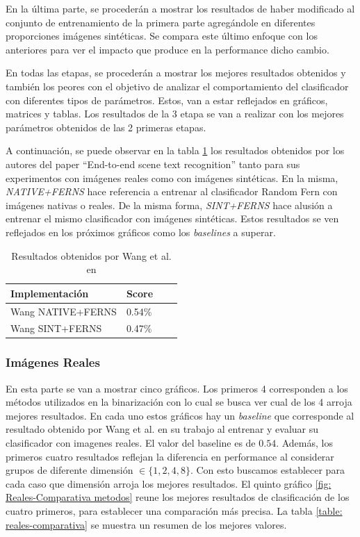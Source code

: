 	En la última parte, se procederán a mostrar los resultados de haber modificado al conjunto de entrenamiento de la primera parte agregándole en diferentes proporciones imágenes sintéticas. Se compara este último enfoque con los anteriores para ver el impacto que produce en la performance dicho cambio.
	
	En todas las etapas, se procederán a mostrar los mejores resultados obtenidos y también los peores con el objetivo de analizar el comportamiento del clasificador con diferentes tipos de parámetros. Estos, van a estar reflejados en gráficos, matrices y tablas. Los resultados de la 3 etapa se van a realizar con los mejores parámetros obtenidos de las 2 primeras etapas.
	
	A continuación, se puede observar en la tabla \ref{table: Wang paper} los resultados obtenidos por los autores del paper ``End-to-end scene text recognition'' tanto para sus experimentos con imágenes reales como con imágenes sintéticas. En la misma, \textit{NATIVE+FERNS} hace referencia a entrenar al clasificador Random Fern con imágenes nativas o reales. De la misma forma, \textit{SINT+FERNS} hace alusión a entrenar el mismo clasificador con imágenes sintéticas. Estos resultados se ven reflejados en los próximos gráficos como los \textit{baselines} a superar.
	
	\begin{table}
		\centering
	    \begin{tabular}{ | l | l | l | p{5cm} |}
    			\hline
    				\textbf{Implementación} & \textbf{Score} \\ \hline
    				Wang NATIVE+FERNS & 0.54\% \\ \hline
    				Wang SINT+FERNS & 0.47\% \\
    			\hline
    		\end{tabular}	
    		\caption[Resultados reales y sintéticas de Wang]{Resultados obtenidos por Wang et al. en \cite{wang}}
    		\label{table: Wang paper}
	\end{table}

	\subsubsection{Imágenes Reales}
	
	En esta parte se van a mostrar cinco gráficos. Los primeros 4 corresponden a los métodos utilizados en la binarización con lo cual se busca ver cual de los 4 arroja mejores resultados. En cada uno estos gráficos hay un \textit{baseline} que corresponde al resultado obtenido por Wang et al. en su trabajo al entrenar y evaluar su clasificador con imagenes reales. El valor del baseline es de $0.54$. Además, los primeros cuatro resultados reflejan la diferencia en performance al considerar grupos de diferente dimensión $\in \{ 1, 2, 4, 8\}$. Con esto buscamos establecer para cada caso que dimensión arroja los mejores resultados. El quinto gráfico \ref{fig: Reales-Comparativa metodos} reune los mejores resultados de clasificación de los cuatro primeros, para establecer una comparación más precisa. La tabla \ref{table: reales-comparativa} se muestra un resumen de los mejores valores.
		
